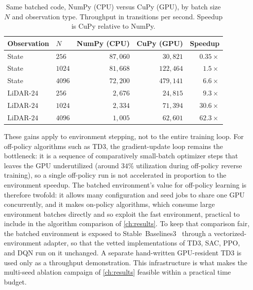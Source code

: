 \begin{table}[H]
\centering
\caption{Same batched code, NumPy (CPU) versus CuPy (GPU), by batch size $N$ and observation type. Throughput in transitions per second. Speedup is CuPy relative to NumPy.}
\label{tab:numpy_cupy}
\begin{tabular}{llrrr}
\toprule
Observation & $N$ & NumPy (CPU) & CuPy (GPU) & Speedup \\
\midrule
State      & $256$  & $87{,}060$ & $30{,}821$  & $0.35\times$ \\
State      & $1024$ & $81{,}668$ & $122{,}464$ & $1.5\times$ \\
State      & $4096$ & $72{,}200$ & $479{,}141$ & $6.6\times$ \\
LiDAR-$24$ & $256$  & $2{,}676$  & $24{,}815$  & $9.3\times$ \\
LiDAR-$24$ & $1024$ & $2{,}334$  & $71{,}394$  & $30.6\times$ \\
LiDAR-$24$ & $4096$ & $1{,}005$  & $62{,}601$  & $62.3\times$ \\
\bottomrule
\end{tabular}
\end{table}

These gains apply to environment stepping, not to the entire training loop. For off-policy algorithms such as TD3, the gradient-update loop remains the bottleneck: it is a sequence of comparatively small-batch optimizer steps that leaves the GPU underutilized (around $34\%$ utilization during off-policy reverse training), so a single off-policy run is not accelerated in proportion to the environment speedup. The batched environment's value for off-policy learning is therefore twofold: it allows many configuration and seed jobs to share one GPU concurrently, and it makes on-policy algorithms, which consume large environment batches directly and so exploit the fast environment, practical to include in the algorithm comparison of \cref{ch:results}. To keep that comparison fair, the batched environment is exposed to Stable~Baselines3~\cite{raffin2021sb3} through a vectorized-environment adapter, so that the vetted implementations of TD3, SAC, PPO, and DQN run on it unchanged. A separate hand-written GPU-resident TD3 is used only as a throughput demonstration. This infrastructure is what makes the multi-seed ablation campaign of \cref{ch:results} feasible within a practical time budget.
